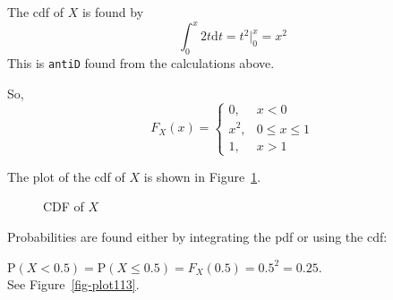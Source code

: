 \documentclass[
  letterpaper,
  DIV=11,
  numbers=noendperiod]{scrreprt}
\begin{document}
\newpage

The cdf of \(X\) is found by \[
\int_0^x 2t \mbox{d}t = t^2\bigg|_0^x = x^2
\] This is \texttt{antiD} found from the calculations above.

So, \[
F_X(x)=\left\{ \begin{array}{ll} 0, & x<0 \\ x^2, & 0\leq x \leq 1 \\ 1, & x>1 \end{array}\right.
\]

The plot of the cdf of \(X\) is shown in Figure~\ref{fig-plot112}.

\begin{figure}


\caption{\label{fig-plot112}CDF of \(X\)}

\end{figure}%

Probabilities are found either by integrating the pdf or using the cdf:

\(\mbox{P}(X < 0.5)=\mbox{P}(X\leq 0.5)=F_X(0.5)=0.5^2=0.25\).\\
See Figure~\ref{fig-plot113}.
\end{document}
